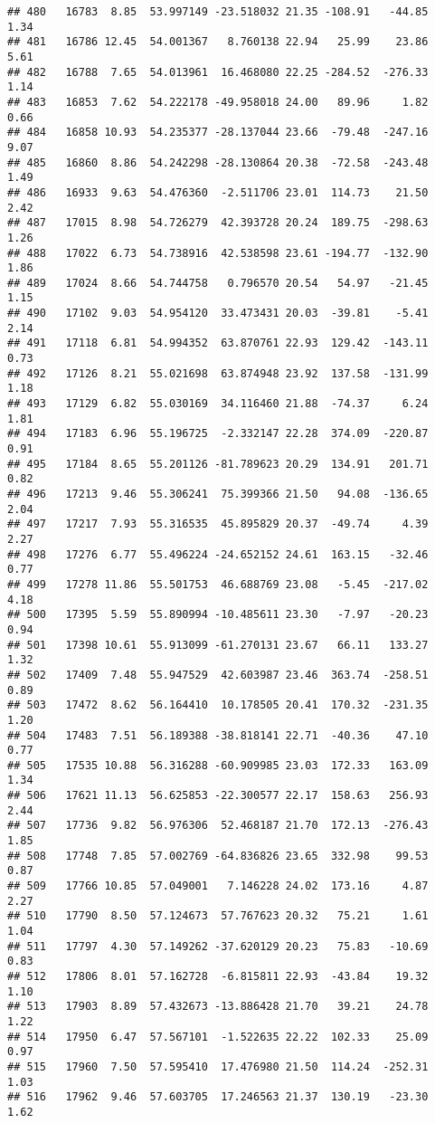 \documentclass[]{article}
\begin{document}
\begin{verbatim}
## 480   16783  8.85  53.997149 -23.518032 21.35 -108.91   -44.85  1.34
## 481   16786 12.45  54.001367   8.760138 22.94   25.99    23.86  5.61
## 482   16788  7.65  54.013961  16.468080 22.25 -284.52  -276.33  1.14
## 483   16853  7.62  54.222178 -49.958018 24.00   89.96     1.82  0.66
## 484   16858 10.93  54.235377 -28.137044 23.66  -79.48  -247.16  9.07
## 485   16860  8.86  54.242298 -28.130864 20.38  -72.58  -243.48  1.49
## 486   16933  9.63  54.476360  -2.511706 23.01  114.73    21.50  2.42
## 487   17015  8.98  54.726279  42.393728 20.24  189.75  -298.63  1.26
## 488   17022  6.73  54.738916  42.538598 23.61 -194.77  -132.90  1.86
## 489   17024  8.66  54.744758   0.796570 20.54   54.97   -21.45  1.15
## 490   17102  9.03  54.954120  33.473431 20.03  -39.81    -5.41  2.14
## 491   17118  6.81  54.994352  63.870761 22.93  129.42  -143.11  0.73
## 492   17126  8.21  55.021698  63.874948 23.92  137.58  -131.99  1.18
## 493   17129  6.82  55.030169  34.116460 21.88  -74.37     6.24  1.81
## 494   17183  6.96  55.196725  -2.332147 22.28  374.09  -220.87  0.91
## 495   17184  8.65  55.201126 -81.789623 20.29  134.91   201.71  0.82
## 496   17213  9.46  55.306241  75.399366 21.50   94.08  -136.65  2.04
## 497   17217  7.93  55.316535  45.895829 20.37  -49.74     4.39  2.27
## 498   17276  6.77  55.496224 -24.652152 24.61  163.15   -32.46  0.77
## 499   17278 11.86  55.501753  46.688769 23.08   -5.45  -217.02  4.18
## 500   17395  5.59  55.890994 -10.485611 23.30   -7.97   -20.23  0.94
## 501   17398 10.61  55.913099 -61.270131 23.67   66.11   133.27  1.32
## 502   17409  7.48  55.947529  42.603987 23.46  363.74  -258.51  0.89
## 503   17472  8.62  56.164410  10.178505 20.41  170.32  -231.35  1.20
## 504   17483  7.51  56.189388 -38.818141 22.71  -40.36    47.10  0.77
## 505   17535 10.88  56.316288 -60.909985 23.03  172.33   163.09  1.34
## 506   17621 11.13  56.625853 -22.300577 22.17  158.63   256.93  2.44
## 507   17736  9.82  56.976306  52.468187 21.70  172.13  -276.43  1.85
## 508   17748  7.85  57.002769 -64.836826 23.65  332.98    99.53  0.87
## 509   17766 10.85  57.049001   7.146228 24.02  173.16     4.87  2.27
## 510   17790  8.50  57.124673  57.767623 20.32   75.21     1.61  1.04
## 511   17797  4.30  57.149262 -37.620129 20.23   75.83   -10.69  0.83
## 512   17806  8.01  57.162728  -6.815811 22.93  -43.84    19.32  1.10
## 513   17903  8.89  57.432673 -13.886428 21.70   39.21    24.78  1.22
## 514   17950  6.47  57.567101  -1.522635 22.22  102.33    25.09  0.97
## 515   17960  7.50  57.595410  17.476980 21.50  114.24  -252.31  1.03
## 516   17962  9.46  57.603705  17.246563 21.37  130.19   -23.30  1.62

\end{verbatim}
\end{document}
